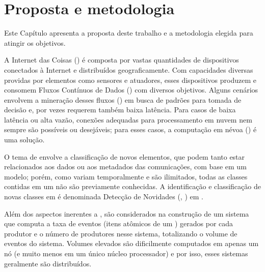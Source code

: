 \chapter{Proposta e metodologia}\label{cha:proposta}

\begin{resumocap}

  Este Capítulo apresenta a proposta deste trabalho e a metodologia elegida para
  atingir os objetivos.

\end{resumocap}


A Internet das Coisas (\iot) é composta por vastas quantidades de dispositivos
conectados à Internet e distribuídos geograficamente.
Com capacidades diversas providas por elementos como sensores e atuadores, esses
dispositivos produzem e consomem Fluxos Contínuos de Dados (\streams) com
diversos objetivos.
Alguns cenários envolvem a mineração desses fluxos (\streamMining) em busca de
padrões para tomada de decisão e, por vezes requerem também baixa latência.
Para casos de baixa latência ou alta vazão, conexões adequadas para
processamento em nuvem nem sempre são possíveis ou desejáveis; para esses casos,
a computação em névoa (\fog) é uma solução.

O tema de \streamMining envolve a classificação de novos elementos,
que podem tanto estar relacionados aos dados ou aos metadados das comunicações,
com base em
um modelo; porém, como \streams variam temporalmente e são ilimitados, todas
as classes contidas em um \stream não são previamente conhecidas.
A identificação e classificação de novas classes em \streams é denominada
Detecção de Novidades (\novelty, \nd) em \streams.

Além dos aspectos inerentes a \streamMining, são considerados na construção de um
sistema que computa \streams a taxa de eventos (itens atômicos de um \stream)
gerados por cada produtor e o número de produtores nesse sistema, totalizando o
volume de eventos do sistema.
Volumes elevados são dificilmente computados em apenas um nó (e muito menos em
um único núcleo processador) e por isso, esses sistemas geralmente são distribuídos.

